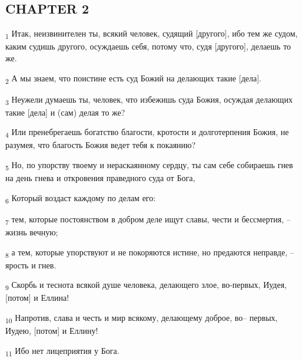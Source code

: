 \subsection{CHAPTER 2}
\begin{tcolorbox}
\textsubscript{1} Итак, неизвинителен ты, всякий человек, судящий [другого], ибо тем же судом, каким судишь другого, осуждаешь себя, потому что, судя [другого], делаешь то же.
\end{tcolorbox}
\begin{tcolorbox}
\textsubscript{2} А мы знаем, что поистине есть суд Божий на делающих такие [дела].
\end{tcolorbox}
\begin{tcolorbox}
\textsubscript{3} Неужели думаешь ты, человек, что избежишь суда Божия, осуждая делающих такие [дела] и (сам) делая то же?
\end{tcolorbox}
\begin{tcolorbox}
\textsubscript{4} Или пренебрегаешь богатство благости, кротости и долготерпения Божия, не разумея, что благость Божия ведет тебя к покаянию?
\end{tcolorbox}
\begin{tcolorbox}
\textsubscript{5} Но, по упорству твоему и нераскаянному сердцу, ты сам себе собираешь гнев на день гнева и откровения праведного суда от Бога,
\end{tcolorbox}
\begin{tcolorbox}
\textsubscript{6} Который воздаст каждому по делам его:
\end{tcolorbox}
\begin{tcolorbox}
\textsubscript{7} тем, которые постоянством в добром деле ищут славы, чести и бессмертия, --жизнь вечную;
\end{tcolorbox}
\begin{tcolorbox}
\textsubscript{8} а тем, которые упорствуют и не покоряются истине, но предаются неправде, --ярость и гнев.
\end{tcolorbox}
\begin{tcolorbox}
\textsubscript{9} Скорбь и теснота всякой душе человека, делающего злое, во-первых, Иудея, [потом] и Еллина!
\end{tcolorbox}
\begin{tcolorbox}
\textsubscript{10} Напротив, слава и честь и мир всякому, делающему доброе, во-- первых, Иудею, [потом] и Еллину!
\end{tcolorbox}
\begin{tcolorbox}
\textsubscript{11} Ибо нет лицеприятия у Бога.
\end{tcolorbox}
